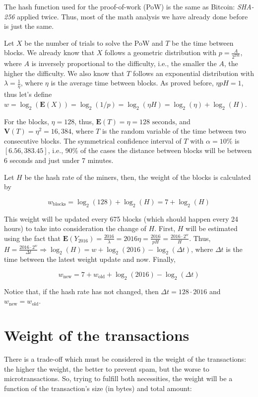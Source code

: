 The hash function used for the proof-of-work (PoW) is the same as Bitcoin: \emph{SHA-256} applied twice. Thus, most of the math analysis we have already done before is just the same.

Let $X$ be the number of trials to solve the PoW and $T$ be the time between blocks. We already know that $X$ follows a geometric distribution with $p = \frac{A}{2^{256}}$, where $A$ is inversely proportional to the difficulty, i.e., the smaller the $A$, the higher the difficulty. We also know that $T$ follows an exponential distribution with $\lambda = \frac{1}{\eta}$, where $\eta$ is the average time between blocks. As proved before, $\eta p H = 1$, thus let's define $w = \log_2(\mathbf{E}(X)) = \log_2(1/p) = \log_2(\eta H) = \log_2(\eta) + \log_2(H)$.

For the blocks, $\eta = 128$, thus, $\mathbf{E}(T) = \eta = 128 \text{ seconds}$, and $\mathbf{V}(T) = \eta^2 = 16,384$, where $T$ is the random variable of the time between two consecutive blocks. The symmetrical confidence interval of $T$ with $\alpha = 10\%$ is $[6.56, 383.45]$, i.e., 90\% of the cases the distance between blocks will be between 6 seconds and just under 7 minutes.

Let $H$ be the hash rate of the miners, then, the weight of the blocks is calculated by

$$w_\text{blocks} = \log_2(128) + \log_2(H) = 7 + \log_2(H)$$

This weight will be updated every 675 blocks (which should happen every 24 hours) to take into consideration the change of $H$. First, $H$ will be estimated using the fact that $\mathbf{E}(Y_{2016}) = \frac{2016}{\lambda} = 2016 \eta = \frac{2016}{pH} = \frac{2016 \cdot 2^w}{H}$. Thus, $H = \frac{2016 \cdot 2^w}{\Delta t} \Rightarrow \log_2(H) = w + \log_2(2016) - \log_2(\Delta t)$, where $\Delta t$ is the time between the latest weight update and now. Finally,

$$w_\text{new} = 7 + w_\text{old} + \log_2(2016) - \log_2(\Delta t)$$

Notice that, if the hash rate has not changed, then $\Delta t = 128 \cdot 2016$ and $w_\text{new} = w_\text{old}$.


\section{Weight of the transactions}

There is a trade-off which must be considered in the weight of the transactions: the higher the weight, the better to prevent spam, but the worse to microtransactions. So, trying to fulfill both necessities, the weight will be a function of the transaction's size (in bytes) and total amount:

